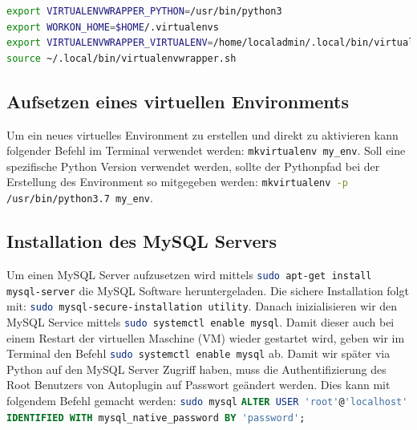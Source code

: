 \begin{lstlisting}[language=bash, caption= Änderungen an .bashrc Datei, label=lst:.bashrc]
export VIRTUALENVWRAPPER_PYTHON=/usr/bin/python3
export WORKON_HOME=$HOME/.virtualenvs
export VIRTUALENVWRAPPER_VIRTUALENV=/home/localadmin/.local/bin/virtualenv
source ~/.local/bin/virtualenvwrapper.sh

\end{lstlisting}

\subsection{Aufsetzen eines virtuellen Environments}
Um ein neues virtuelles Environment zu erstellen und direkt zu aktivieren kann folgender Befehl im Terminal verwendet werden: \lstinline[language=bash]{mkvirtualenv my_env}. Soll eine spezifische Python Version verwendet werden, sollte der Pythonpfad bei der Erstellung des Environment so mitgegeben werden: \lstinline[language=bash]{mkvirtualenv -p /usr/bin/python3.7 my_env}.

\subsection{Installation des MySQL Servers}
Um einen MySQL Server aufzusetzen wird mittels \lstinline[language=bash]{sudo apt-get install mysql-server} die MySQL Software heruntergeladen. Die sichere Installation folgt mit: \lstinline[language=bash]{sudo mysql-secure-installation utility}. Danach inizialisieren wir den MySQL Service mittels \lstinline[language=bash]{sudo systemctl enable mysql}. Damit dieser auch bei einem Restart der virtuellen Maschine (VM) wieder gestartet wird, geben wir im Terminal den Befehl \lstinline[language=bash]{sudo systemctl enable mysql} ab.
Damit wir später via Python auf den MySQL Server Zugriff haben, muss die Authentifizierung des Root Benutzers von Autoplugin auf Passwort geändert werden. Dies kann mit folgendem Befehl gemacht werden: \lstinline[language=bash]{sudo mysql} \lstinline[language=SQL]{ALTER USER 'root'@'localhost' IDENTIFIED WITH mysql_native_password BY 'password';}

